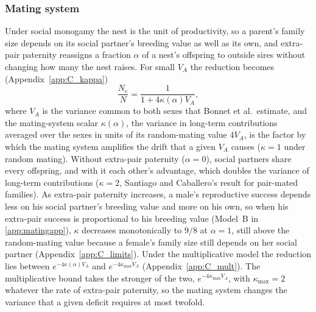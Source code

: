 \documentclass{article}
\begin{document}
\subsubsection{Mating system}\label{sec:mating}
Under social monogamy the nest is the unit of productivity, so a parent's family size depends on its social partner's breeding value as well as its own, and extra-pair paternity reassigns a fraction $\alpha$ of a nest's offspring to outside sires without changing how many the nest raises. For small $V_A$ the reduction becomes (Appendix~\ref{app:C_kappa})
\begin{equation}
    \frac{N_e}{N} = \frac{1}{1 + 4\kappa(\alpha)V_A}, \label{unlinked_mating}
\end{equation}
where $V_A$ is the variance common to both sexes that Bonnet et al.~estimate, and the mating-system scalar $\kappa(\alpha)$, the variance in long-term contributions averaged over the sexes in units of its random-mating value $4V_A$, is the factor by which the mating system amplifies the drift that a given $V_A$ causes ($\kappa = 1$ under random mating). Without extra-pair paternity ($\alpha = 0$), social partners share every offspring, and with it each other's advantage, which doubles the variance of long-term contributions ($\kappa = 2$, Santiago and Caballero's result for pair-mated families). As extra-pair paternity increases, a male's reproductive success depends less on his social partner's breeding value and more on his own, so when his extra-pair success is proportional to his breeding value (Model~B in \autoref{app:matingapp}), $\kappa$ decreases monotonically to $9/8$ at $\alpha = 1$, still above the random-mating value because a female's family size still depends on her social partner (Appendix~\ref{app:C_limits}). Under the multiplicative model the reduction lies between $e^{-4\kappa(\alpha)V_A}$ and $e^{-4\kappa_\text{max}V_A}$ (Appendix~\ref{app:C_mult}). The multiplicative bound takes the stronger of the two, $e^{-4\kappa_\text{max}V_A}$, with $\kappa_\text{max} = 2$ whatever the rate of extra-pair paternity, so the mating system changes the variance that a given deficit requires at most twofold.
\end{document}
